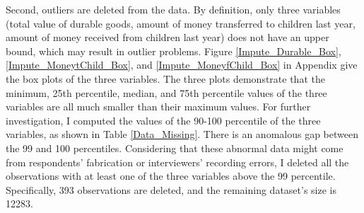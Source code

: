 \documentclass[12pt]{article}
\begin{document}
Second, outliers are deleted from the data. By definition, only three variables (total value of durable goods, amount of money transferred to children last year, amount of money received from children last year) does not have an upper bound, which may result in outlier problems. Figure \ref{Impute_Durable_Box}, \ref{Impute_MoneytChild_Box}, and  \ref{Impute_MoneyfChild_Box}  in Appendix give the box plots of the three variables. The three plots demonstrate that the minimum, 25th percentile, median, and 75th percentile values of the three variables are all much smaller than their maximum values. For further investigation, I computed the values of the 90-100 percentile of the three variables, as shown in Table \ref{Data_Missing}. There is an anomalous gap between the 99 and 100 percentiles. Considering that these abnormal data might come from respondents' fabrication or interviewers' recording errors, I deleted all the observations with at least one of the three variables above the 99 percentile. Specifically, 393 observations are deleted, and the remaining dataset's size is 12283.

\begin{table}[htbp]
    \centering
    \caption{Percentail Distribution}   \label{Money_Percentail}
  \end{table}%
\end{document}
